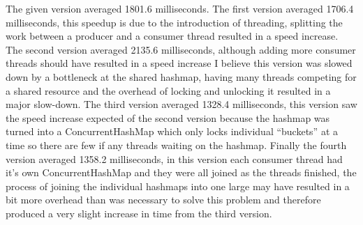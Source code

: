 \documentclass[11pt, letterpaper]{article}
\begin{document}
The given version averaged 1801.6 milliseconds. The first version averaged 1706.4 milliseconds, this speedup is due to the introduction of threading, splitting the work between a producer and a consumer thread resulted in a speed increase. The second version averaged 2135.6 milliseconds, although adding more consumer threads should have resulted in a speed increase I believe this version was slowed down by a bottleneck at the shared hashmap, having many threads competing for a shared resource and the overhead of locking and unlocking it resulted in a major slow-down. The third version averaged 1328.4 milliseconds, this version saw the speed increase expected of the second version because the hashmap was turned into a ConcurrentHashMap which only locks individual ``buckets'' at a time so there are few if any threads waiting on the hashmap. Finally the fourth version averaged 1358.2 milliseconds, in this version each consumer thread had it's own ConcurrentHashMap and they were all joined as the threads finished, the process of joining the individual hashmaps into one large may have resulted in a bit more overhead than was necessary to solve this problem and therefore produced a very slight increase in time from the third version.
\end{document}
